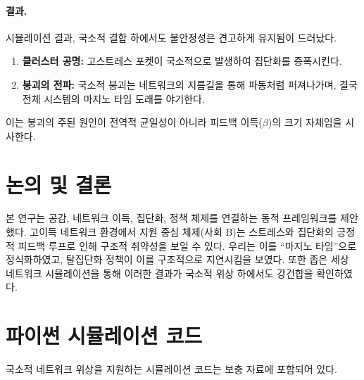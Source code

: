 \documentclass[11pt]{article}
\theoremstyle{plain}
\begin{document}
\paragraph{결과.}
시뮬레이션 결과, 국소적 결합 하에서도 불안정성은 견고하게 유지됨이 드러났다.
\begin{enumerate}
    \item \textbf{클러스터 공명:} 고스트레스 포켓이 국소적으로 발생하여 집단화를 증폭시킨다.
    \item \textbf{붕괴의 전파:} 국소적 붕괴는 네트워크의 지름길을 통해 파동처럼 퍼져나가며, 결국 전체 시스템의 마지노 타임 도래를 야기한다.
\end{enumerate}
이는 붕괴의 주된 원인이 전역적 균일성이 아니라 피드백 이득($\beta$)의 크기 자체임을 시사한다.

\section{논의 및 결론}

본 연구는 공감, 네트워크 이득, 집단화, 정책 체제를 연결하는 동적 프레임워크를 제안했다.
고이득 네트워크 환경에서 지원 중심 체제(사회 B)는 스트레스와 집단화의 긍정적 피드백 루프로 인해 구조적 취약성을 보일 수 있다.
우리는 이를 ``마지노 타임''으로 정식화하였고, 탈집단화 정책이 이를 구조적으로 지연시킴을 보였다.
또한 좁은 세상 네트워크 시뮬레이션을 통해 이러한 결과가 국소적 위상 하에서도 강건합을 확인하였다.

\appendix

\section{파이썬 시뮬레이션 코드}
\label{app:code}

국소적 네트워크 위상을 지원하는 시뮬레이션 코드는 보충 자료에 포함되어 있다.
\end{document}
